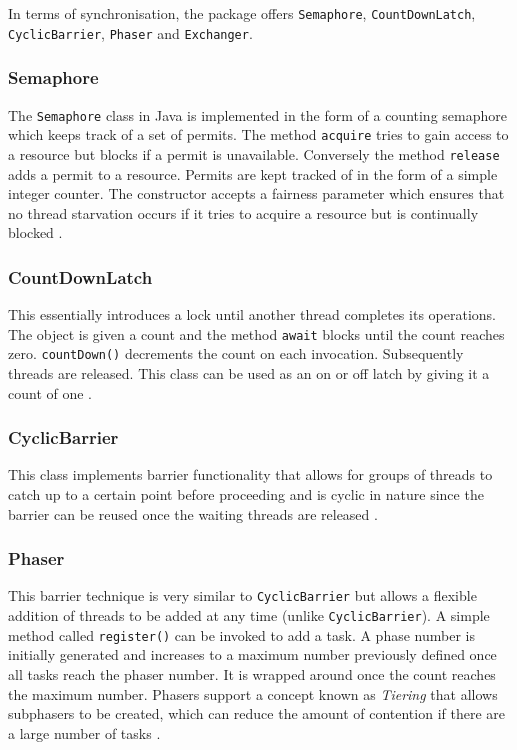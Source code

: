\documentclass[12pt,a4paper,oneside]{article}
\def\code#1{\texttt{#1}}
\begin{document}
\begin{spacing}{1.4}
In terms of synchronisation, the package offers \code{Semaphore}, \code{CountDownLatch}, \code{CyclicBarrier}, \code{Phaser} and \code{Exchanger}. 

\subsubsection{Semaphore}
The \code{Semaphore} class in Java is implemented in the form of a counting semaphore which keeps track of a set of permits. The method \code{acquire} tries to gain access to a resource but blocks if a permit is unavailable. Conversely the method \code{release} adds a permit to a resource. Permits are kept tracked of in the form of a simple integer counter. The constructor accepts a fairness parameter which ensures that no thread starvation occurs if it tries to acquire a resource but is continually blocked \citep{JavaAPI}.

\subsubsection{CountDownLatch}
This essentially introduces a lock until another thread completes its operations. The object is given a count and the method \code{await} blocks until the count reaches zero. \code{countDown()} decrements the count on each invocation. Subsequently threads are released. This class can be used as an on or off latch by giving it a count of one \citep{JavaAPI}.

\subsubsection{CyclicBarrier}
This class implements barrier functionality that allows for groups of threads to catch up to a certain point before proceeding and is cyclic in nature since the barrier can be reused once the waiting threads are released \citep{JavaAPI}.

\subsubsection{Phaser}
This barrier technique is very similar to \code{CyclicBarrier} but allows a flexible addition of threads to be added at any time (unlike \code{CyclicBarrier}). A simple method called \code{register()} can be invoked to add a task. A phase number is initially generated and increases to a maximum number previously defined once all tasks reach the phaser number. It is wrapped around once the count reaches the maximum number. Phasers support a concept known as \textit{Tiering} that allows subphasers to be created, which can reduce the amount of contention if there are a large number of tasks \cite{JavaAPI}.


\end{spacing}
\end{document}
